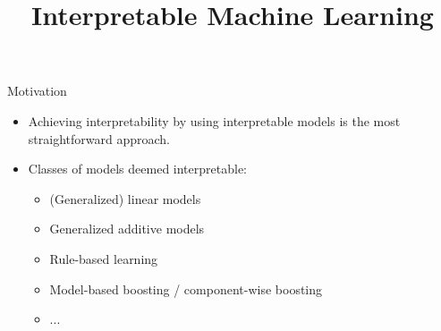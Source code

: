 \documentclass[11pt,compress,t,notes=noshow, aspectratio=169, xcolor=table]{beamer}
\title{Interpretable Machine Learning}
\date{}
\begin{document}
\newcommand{\titlefigure}{figure/whitebox}
\newcommand{\learninggoals}{
\item What characteristics does an interpretable model have?
\item Why should we use interpretable models at all?
\item Examples for interpretable models.}


\begin{frame}{Motivation}

    \begin{itemize}
        \item Achieving interpretability by using interpretable models is the most straightforward approach.
        \bigskip
        \item Classes of models deemed interpretable:
        \begin{itemize}
            \item (Generalized) linear models
            \item Generalized additive models
            \item Rule-based learning
            \item Model-based boosting / component-wise boosting
            \item ...
        \end{itemize}
    \end{itemize}

\end{frame}
\end{document}
